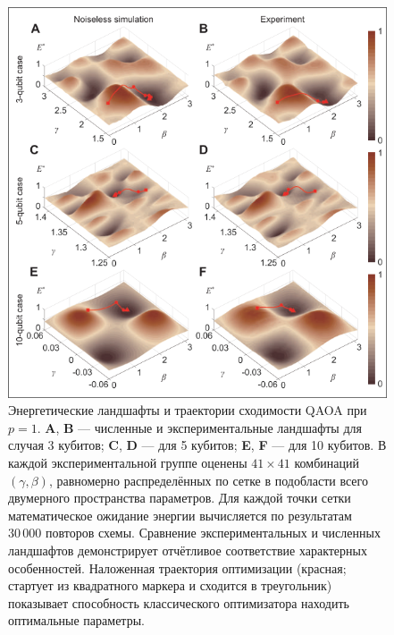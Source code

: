 \begin{figure}
    \centering
    \includegraphics[scale=0.4]{inc/fig_03.png}
    \caption{
        Энергетические ландшафты и траектории сходимости QAOA при $p = 1$.
        \textbf{A}, \textbf{B} — численные и экспериментальные ландшафты для
        случая 3 кубитов; \textbf{C}, \textbf{D} — для 5 кубитов; \textbf{E},
        \textbf{F} — для 10 кубитов. В каждой экспериментальной группе оценены
        $41\times 41$ комбинаций $(\gamma,\beta)$, равномерно распределённых по
        сетке в подобласти всего двумерного пространства параметров. Для каждой
        точки сетки математическое ожидание энергии вычисляется по результатам
        $30\,000$ повторов схемы. Сравнение экспериментальных и численных
        ландшафтов демонстрирует отчётливое соответствие характерных
        особенностей. Наложенная траектория оптимизации (красная; стартует из
        квадратного маркера и сходится в треугольник) показывает способность
        классического оптимизатора находить оптимальные параметры.
    }
    \label{fig:fig03}
\end{figure}

